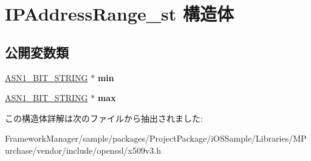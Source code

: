\hypertarget{struct_i_p_address_range__st}{}\section{I\+P\+Address\+Range\+\_\+st 構造体}
\label{struct_i_p_address_range__st}
\subsection*{公開変数類}
\begin{DoxyCompactItemize}
\item 
\hypertarget{struct_i_p_address_range__st_a5a60ca0834f68ec801f037ba4cb22651}{}\hyperlink{structasn1__string__st}{A\+S\+N1\+\_\+\+B\+I\+T\+\_\+\+S\+T\+R\+I\+N\+G} $\ast$ {\bfseries min}\label{struct_i_p_address_range__st_a5a60ca0834f68ec801f037ba4cb22651}

\item 
\hypertarget{struct_i_p_address_range__st_a501c4fffd9d31b1990d81895c803bc6a}{}\hyperlink{structasn1__string__st}{A\+S\+N1\+\_\+\+B\+I\+T\+\_\+\+S\+T\+R\+I\+N\+G} $\ast$ {\bfseries max}\label{struct_i_p_address_range__st_a501c4fffd9d31b1990d81895c803bc6a}

\end{DoxyCompactItemize}


この構造体詳解は次のファイルから抽出されました\+:\begin{DoxyCompactItemize}
\item 
Framework\+Manager/sample/packages/\+Project\+Package/i\+O\+S\+Sample/\+Libraries/\+M\+Purchase/vendor/include/openssl/x509v3.\+h\end{DoxyCompactItemize}
